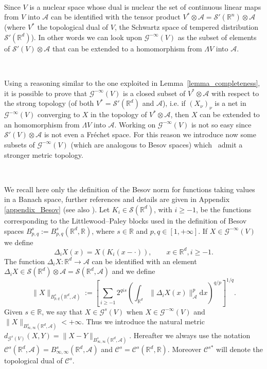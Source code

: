 \documentclass{article}
\newcommand{\assign}{:=}
\newcommand{\asterisk}{\mathord{*}}
\newcommand{\mathd}{\mathrm{d}}
\begin{document}
\

Since $V$ is a nuclear space whose dual is nuclear the set of continuous
linear maps from $V$ into $\mathcal{A}$ can be identified with the tensor
product $V^{\asterisk} \otimes \mathcal{A} = \mathcal{S}' (\mathbb{R}^n)
\otimes \mathcal{A}$ (where $V^{\asterisk}$ the topological dual of $V$, the
Schwartz space of tempered distribution $\mathcal{S}' (\mathbb{R}^d)$). In
other words we can look upon $\mathcal{G}^{- \infty} (V)$ as the subset of
elements of $\mathcal{S}' (V) \otimes \mathcal{A}$ that can be extended to a
homomorphism from $\Lambda V$ into $\mathcal{A}$.

\

Using a reasoning similar to the one exploited in
Lemma~\ref{lemma_completeness}, it is possible to prove that $\mathcal{G}^{-
\infty} (V)$ is a closed subset of $V^{\asterisk} \otimes \mathcal{A}$ with
respect to the strong topology (of both $V^{\asterisk} = \mathcal{S}'
(\mathbb{R}^d)$ and $\mathcal{A}$), i.e. if $(X_{\nu})_{\nu}$ is a net in
$\mathcal{G}^{- \infty} (V)$ converging to $X$ in the topology of
$V^{\asterisk} \otimes \mathcal{A}$, then $X$ can be extended to an
homomorphism from $\Lambda V$ into $\mathcal{A}$. Working on $\mathcal{G}^{-
\infty} (V)$ is not so easy since $\mathcal{S}' (V) \otimes \mathcal{A}$ is
not even a Fr{\'e}chet space. For this reason we introduce now some subsets of
$\mathcal{G}^{- \infty} (V)$ (which are analogous to Besov spaces) which \
admit a stronger metric topology.

\

We recall here only the definition of the Besov norm for functions taking
values in a Banach space, further references and details are given in Appendix
\ref{appendix_Besov} (see also {\cite{Amann1997,Amann2019}}). Let $K_i \in
\mathcal{S} (\mathbb{R}^d)$, with $i \geqslant - 1$, be the functions
corresponding to the Littlewood--Paley blocks used in the definition of Besov
spaces $B^s_{p, q} \assign B^s_{p, q} (\mathbb{R}^d, \mathbb{R})$, where $s
\in \mathbb{R}$ and $p, q \in [1, + \infty]$. If $X \in \mathcal{G}^{- \infty}
(V)$ we define
\[ \Delta_i X (x) = X (K_i (x - \cdot)), \qquad x \in \mathbb{R}^d, i
   \geqslant - 1. \]
The function $\Delta_i X : \mathbb{R}^d \rightarrow \mathcal{A}$ can be
identified with an element $\Delta_i X \in \mathcal{S} (\mathbb{R}^d) \otimes
\mathcal{A} = \mathcal{S} (\mathbb{R}^d, \mathcal{A})$ and we define
\[ \| X \|_{B^s_{p, q} (\mathbb{R}^d, \mathcal{A})} \assign \left[ \sum_{i
   \geqslant - 1} 2^{q i s} \left( \int_{\mathbb{R}^d} \| \Delta_i X (x)
   \|_{\mathcal{A}}^p \mathd x \right)^{q / p}_{} \right]^{1 / q} . \]
Given $s \in \mathbb{R}$, we say that $X \in \mathcal{G}^s (V)$ when $X \in
\mathcal{G}^{- \infty} (V)$ and $\| X \|_{B^s_{\infty, \infty} (\mathbb{R}^d,
\mathcal{A})} < + \infty$. Thus we introduce the natural metric
$d_{\mathcal{G}^s (V)} (X, Y) = \| X - Y \|_{B^s_{\infty, \infty}
(\mathbb{R}^d, \mathcal{A})}$. Hereafter we always use the notation
$\mathcal{C}^s (\mathbb{R}^d, \mathcal{A}) = B^s_{\infty, \infty}
(\mathbb{R}^d, \mathcal{A})$ and $\mathcal{C}^s = \mathcal{C}^s (\mathbb{R}^d,
\mathbb{R})$. Moreover $\mathcal{C}^{s \asterisk}$ will denote the topological
dual of $\mathcal{C}^s$.
\end{document}
